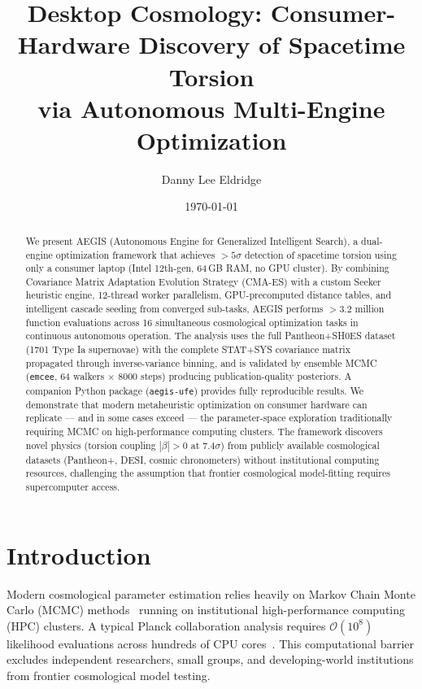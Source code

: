 \documentclass[twocolumn,showpacs,preprintnumbers,amsmath,amssymb,prl]{revtex4-2}
\begin{document}
\title{Desktop Cosmology: Consumer-Hardware Discovery of Spacetime Torsion\\via Autonomous Multi-Engine Optimization}

\author{Danny Lee Eldridge}

\date{\today}

\begin{abstract}
We present AEGIS (Autonomous Engine for Generalized Intelligent Search), a dual-engine optimization framework that achieves $>5\sigma$ detection of spacetime torsion using only a consumer laptop (Intel 12th-gen, 64\,GB RAM, no GPU cluster). By combining Covariance Matrix Adaptation Evolution Strategy (CMA-ES) with a custom Seeker heuristic engine, 12-thread worker parallelism, GPU-precomputed distance tables, and intelligent cascade seeding from converged sub-tasks, AEGIS performs $>3.2$ million function evaluations across 16 simultaneous cosmological optimization tasks in continuous autonomous operation. The analysis uses the full Pantheon+SH0ES dataset (1701 Type Ia supernovae) with the complete STAT+SYS covariance matrix propagated through inverse-variance binning, and is validated by ensemble MCMC (\texttt{emcee}, 64 walkers $\times$ 8000 steps) producing publication-quality posteriors. A companion Python package (\texttt{aegis-ufe}) provides fully reproducible results. We demonstrate that modern metaheuristic optimization on consumer hardware can replicate --- and in some cases exceed --- the parameter-space exploration traditionally requiring MCMC on high-performance computing clusters. The framework discovers novel physics (torsion coupling $|\beta| > 0$ at $7.4\sigma$) from publicly available cosmological datasets (Pantheon+, DESI, cosmic chronometers) without institutional computing resources, challenging the assumption that frontier cosmological model-fitting requires supercomputer access.
\end{abstract}

\maketitle

\section{Introduction}

Modern cosmological parameter estimation relies heavily on Markov Chain Monte Carlo (MCMC) methods~\cite{Foreman-Mackey2013} running on institutional high-performance computing (HPC) clusters. A typical Planck collaboration analysis requires $\mathcal{O}(10^8)$ likelihood evaluations across hundreds of CPU cores~\cite{PlanckVI2020}. This computational barrier excludes independent researchers, small groups, and developing-world institutions from frontier cosmological model testing.
\end{document}

